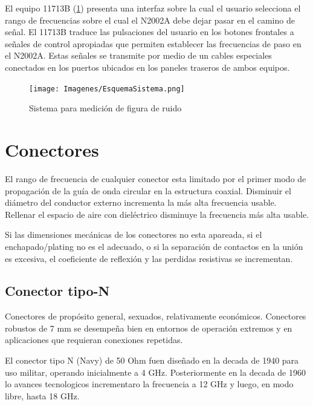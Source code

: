 \documentclass{article}
\begin{document}
	El equipo 11713B (\ref{Fig:EsquemaSistemaMedicion}) presenta una interfaz sobre la cual el usuario selecciona el rango de frecuencias sobre el	cual el N2002A debe dejar pasar en el camino de señal. El 11713B traduce las pulsaciones del usuario en los botones frontales a señales de control apropiadas que permiten establecer las frecuencias de paso en el N2002A. Estas señales	se transmite por medio de un cables especiales conectados en los puertos ubicados en los paneles traseros de ambos equipos.
	
	\begin{figure}[h!]
		\centering
		\begin{minipage}{18.516cm}
			\texttt{[image: Imagenes/EsquemaSistema.png]}
		\end{minipage}
		\caption{Sistema para medición de figura de ruido}
		\label{Fig:EsquemaSistemaMedicion}
	\end{figure}

	\section{Conectores}
	
	El rango de frecuencia de cualquier conector esta limitado por el primer modo de propagación de la guía de onda circular
	en la estructura coaxial. Disminuir el diámetro del conductor externo incrementa la más alta frecuencia usable.
	Rellenar el espacio de aire con dieléctrico disminuye la frecuencia más alta usable.
	
	Si las dimensiones mecánicas de los conectores no esta apareada, si el enchapado/plating no es el adecuado, o si la
	separación de contactos en la unión es excesiva, el coeficiente de reflexión y las perdidas resistivas se incrementan.
	
	\subsection{Conector tipo-N}
	
	Conectores de propósito general, sexuados, relativamente económicos. Conectores robustos de 7 mm se desempeña bien en
	entornos de operación extremos y en aplicaciones que requieran conexiones repetidas.
	
	El conector tipo N (Navy) de 50 Ohm fuen diseñado en la decada de 1940 para uso militar, operando inicialmente a 4 GHz.
	Posteriormente en la decada de 1960 lo avances tecnologicos incrementaro la frecuencia a 12 GHz y luego, en modo libre,
	hasta 18 GHz.
	
\end{document}
